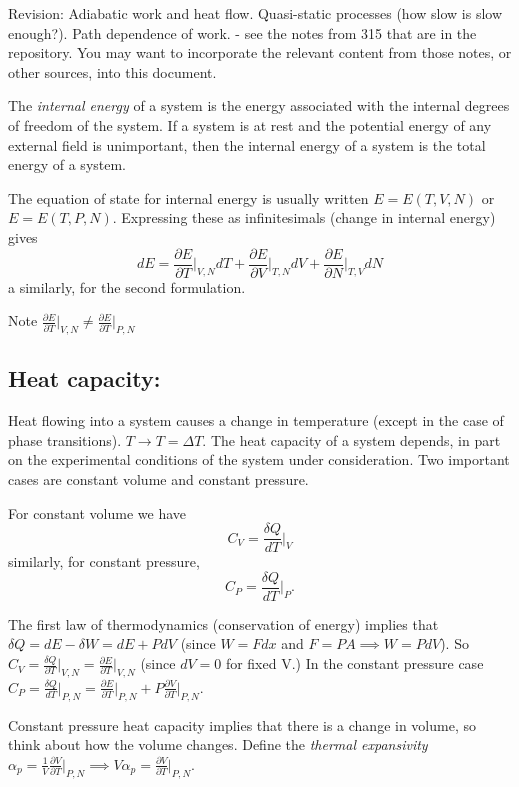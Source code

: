 \documentclass{article}
\begin{document}
Revision: Adiabatic work and heat flow. Quasi-static processes (how slow is slow enough?). Path dependence of work.
 - see the notes from 315 that are in the repository. You may want to incorporate the relevant content from those notes, or other sources, into this document.


The \emph{internal energy} of a system is the energy associated with the internal degrees of freedom of the system. If a system is at rest and the potential energy of any external field is unimportant, then the internal energy of a system is the total energy of a system.

The equation of state for internal energy is usually written $E = E(T,V,N)$ or $E = E(T,P,N)$. Expressing these as infinitesimals (change in internal energy) gives
$$ dE = \frac{\partial E}{\partial T}\bigg\vert_{V,N}dT + \frac{\partial E}{\partial V}\bigg\vert_{T,N}dV +\frac{\partial E}{\partial N}\bigg\vert_{T,V}dN$$
a similarly, for the second formulation.

Note $ \frac{\partial E}{\partial T}\vert_{V,N} \neq \frac{\partial E}{\partial T}\vert_{P,N} $

\subsection*{Heat capacity:}
Heat flowing into a system causes a change in temperature (except in the case of phase transitions). $T\rightarrow T=\Delta T$. The heat capacity of a system depends, in part on the experimental conditions of the system under consideration. Two important cases are constant volume and constant pressure.

For constant volume we have
$$C_V = \frac{\delta Q}{dT}\bigg\vert_V$$
similarly, for constant pressure,
$$C_P = \frac{\delta Q}{dT}\bigg\vert_P.$$

The first law of thermodynamics (conservation of energy) implies that $\delta Q = dE - \delta W = dE + PdV$  (since $W = Fdx$ and $F=PA \implies W = PdV$). So
$C_V = \frac{\delta Q}{\partial T}\vert_{V,N} = \frac{\partial E}{\partial T}\vert_{V,N}$ (since $dV=0$ for fixed V.)
In the constant pressure case $C_P = \frac{\delta Q}{dT}\vert_{P,N} = \frac{\partial E}{\partial T}\vert_{P,N} + P\frac{\partial V}{\partial T}\vert_{P,N}$.

Constant pressure heat capacity implies that there is a change in volume, so think about how the volume changes. Define the \emph{thermal expansivity} $\alpha_p = \frac{1}{V}\frac{\partial V}{\partial T}\vert_{P,N} \implies V\alpha_p =\frac{\partial V}{\partial T}\vert_{P,N}$.
\end{document}
